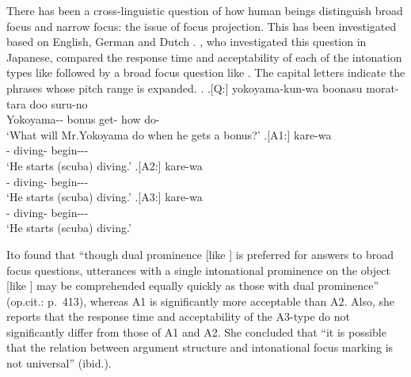 There has been a cross-linguistic question of how
human beings distinguish broad focus and narrow focus:
the issue of focus projection.
This has been investigated based on English, German and Dutch
\cite{selkirk84,gussenhoven83}.
, who investigated this question in Japanese,
compared the response time and acceptability of each of the intonation types like \Next[A1-A3]
followed by a broad focus question like \Next[Q].
The capital letters indicate the phrases whose pitch range is expanded.
\ex.
 \ag.[Q:] yokoyama-kun-wa boonasu morat-tara doo suru-no \\
          Yokoyama-- bonus get- how do- \\
          `What will Mr.Yokoyama do when he gets a bonus?'
 \bg.[A1:] kare-wa   \\
           - diving- begin--- \\
           `He starts (scuba) diving.'
 \bg.[A2:] kare-wa   \\
           - diving- begin--- \\
           `He starts (scuba) diving.'
 \bg.[A3:] kare-wa   \\
           - diving- begin--- \\
           `He starts (scuba) diving.'
      \hfill{\cite[412]{ito02}}

Ito found that
``though dual prominence [like \Last[A1]] is preferred for answers to broad focus questions,
utterances with a single intonational prominence on the object [like \Last[A2]] may be comprehended equally quickly as those with dual prominence'' (op.cit.: p.~413),
whereas A1 is significantly more acceptable than A2.
Also, she reports that the response time and acceptability of the A3-type do not significantly differ from those of A1 and A2.
She concluded that
``it is possible that the relation between argument structure and intonational focus marking is not universal'' (ibid.).

